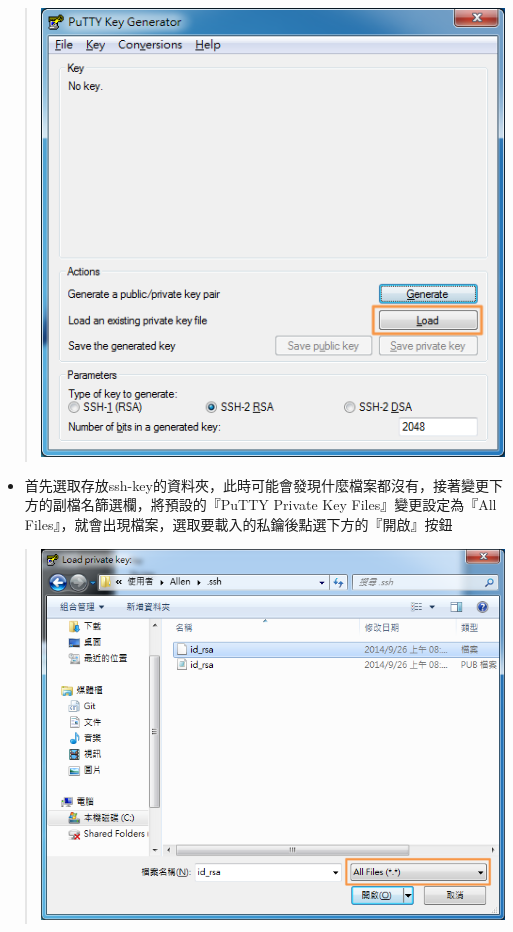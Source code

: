 \documentclass[letterpaper,10pt,english]{sphinxmanual}
\begin{document}
\begin{quote}

\includegraphics{openssh-putty-003.png}
\end{quote}
\begin{itemize}
\item {} 
首先選取存放ssh-key的資料夾，此時可能會發現什麼檔案都沒有，接著變更下方的副檔名篩選欄，將預設的『PuTTY Private Key Files』變更設定為『All Files』，就會出現檔案，選取要載入的私鑰後點選下方的『開啟』按鈕

\end{itemize}
\begin{quote}

\includegraphics{openssh-putty-004.png}
\end{quote}
\end{document}
